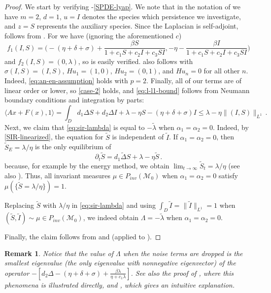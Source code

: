 \documentclass[final]{amsart}
\newtheorem{rem}[thm]{Remark}
\numberwithin{thm}{section}
\numberwithin{equation}{section}
\newcommand{\mcM}{\mathcal{M}}
\newcommand{\ip}[2]{\langle #1, #2 \rangle}
\begin{document}
\begin{proof}
    
    We start by verifying -\ref{SPDE-lyap}. We note that in the notation of  we have $m = 2$, $d = 1$, $u = I$ denotes the species which persistence we investigate, and $z = S$ represents the auxiliary species. Since the Laplacian is self-adjoint,  follows from . For  we have (ignoring the aforementioned $c$) 
    $$
    f_1(I,S) = \Big(-(\eta+\delta+\sigma)+\frac{\beta S}{1 + c_1S + c_2I + c_3SI},-\eta-\frac{\beta I}{1 + c_1S + c_2I + c_3SI}\Big)
    $$ 
    and $f_2(I,S) = (0,\lambda)$, so  is easily verified.   also follows with $\sigma(I,S) = (I,S)$, $Hu_1 = (1,0)$, $Hu_2 = (0,1)$, and $Hu_n = 0$ for all other $n$. Indeed, \eqref{eq:an-en-assumption} holds with $p = 2$. Finally, all of our terms are of linear order or lower, so \ref{case-2} holds, and \eqref{eq:l-l1-bound} follows from
    Neumann boundary conditions and integration by parts:
    \begin{equation*}
        \ip{Ax + F(x)}{1} = \int_D d_1\Delta S + d_2\Delta I + \lambda - \eta S - (\eta + \delta +\sigma)I \leq \lambda - \eta\|(I,S)\|_{L^1} \,.
    \end{equation*}
Next, we claim that \eqref{eq:sir-lambda} is equal to $-\tilde \lambda$ when $\alpha_1 = \alpha_2 = 0$. 
Indeed, by \eqref{SIR-linearized}, the equation for $\tilde S$ is independent of $\tilde I$. If $\alpha_1 = \alpha_2 = 0$, then $\tilde S_E = \lambda/\eta$ is the only equilibrium of 
$$
\partial_t\tilde S = d_1 \tilde \Delta S + \lambda - \eta \tilde S \,.
$$ 
because, for example by the energy method, we obtain $\lim_{t \to \infty} \tilde S_t = \lambda / \eta$ (see also ). 
Thus, all invariant measures $\mu \in P_{inv}(\mcM_0)$ when $\alpha_1 = \alpha_2 = 0$ satisfy $\mu(\{\tilde S = \lambda/\eta\}) = 1$. 


Replacing $\tilde S$ with $\lambda /\eta$ in \eqref{eq:sir-lambda} and using $\int_D \tilde I = \|\tilde I\|_{L^1} = 1$ when $(\tilde S, \tilde I) \sim \mu \in P_{inv}(\mcM_0)$, we indeed obtain $\Lambda = -\tilde \lambda$ when $\alpha_1 = \alpha_2 = 0$.

Finally, the claim follows from  and  (applied to ).
        
\end{proof}
\begin{rem}\label{rem:eigenvalue-for-SIR}
    Notice that the value of $\Lambda$ when the noise terms are dropped is the smallest eigenvalue (the only eigenvalue with nonnegative eigenvector) of the operator $-[d_2\Delta - (\eta + \delta + \sigma) + \frac{\beta \lambda}{\eta + c_1 \lambda}]$. See also the proof of , where this phenomena is illustrated directly, and , which gives an intuitive explanation.
\end{rem}
\end{document}

